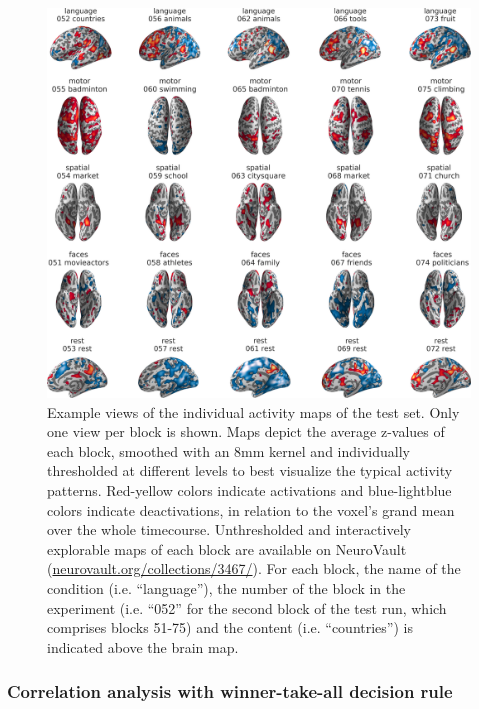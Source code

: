 \documentclass[fleqn,10pt]{SelfArx} %
\begin{document}
\begin{figure}[htbp]
	\begin{minipage}{\textwidth}
		\renewcommand{\familydefault}{\sfdefault}\normalfont
		\centering
		\includegraphics[width=\columnwidth]{./figs/fig6_blockTestBrains.png}
				\vspace*{-3mm}
		\caption{Example views of the individual activity maps of the test set. Only one view per block is shown. Maps depict the average z-values of each block, smoothed with an 8mm kernel and individually thresholded at different levels to best visualize the typical activity patterns. Red-yellow colors indicate activations and blue-lightblue colors indicate deactivations, in relation to the voxel's grand mean over the whole timecourse. Unthresholded and interactively explorable maps of each block are available on NeuroVault (\href{https://neurovault.org/collections/3467/}{neurovault.org/collections/3467/}). For each block, the name of the condition (i.e. “language”), the number of the block in the experiment (i.e. “052” for the second block of the test run, which comprises blocks 51-75) and the content (i.e. “countries”) is indicated above the brain map.}%
		\label{fig:testBrains}
	\end{minipage}
\end{figure}


\subsubsection*{Correlation analysis with winner-take-all decision rule}
\end{document}
